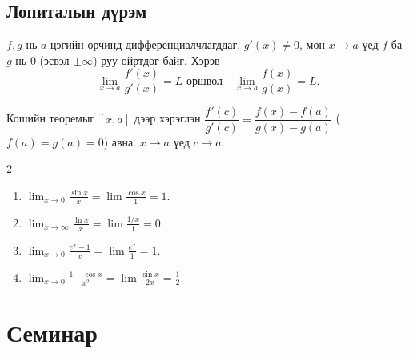 \subsection{Лопиталын дүрэм}

\begin{theorem}[Лопитал]
$f,g$ нь $a$ цэгийн орчинд дифференциалчлагддаг, $g'(x)\ne0$, мөн $x\to a$ үед $f$ ба $g$ нь $0$ (эсвэл $\pm\infty$) руу ойртдог байг. Хэрэв
\[
\lim_{x\to a}\frac{f'(x)}{g'(x)}=L \text{ оршвол}\quad 
\lim_{x\to a}\frac{f(x)}{g(x)}=L.
\]
\end{theorem}

\begin{prof}
Кошийн теоремыг $[x,a]$ дээр хэрэглэн $\dfrac{f'(c)}{g'(c)}=\dfrac{f(x)-f(a)}{g(x)-g(a)}$ ($f(a)=g(a)=0$) авна. $x\to a$ үед $c\to a$.
\end{prof}
\begin{example}
\begin{multicols}{2}
\begin{enumerate}[itemsep=2pt]
\item $\displaystyle \lim_{x\to0}\frac{\sin x}{x}=\lim\frac{\cos x}{1}=1.$
\item $\displaystyle \lim_{x\to\infty}\frac{\ln x}{x}=\lim\frac{1/x}{1}=0.$
\item $\displaystyle \lim_{x\to0}\frac{e^x-1}{x}=\lim\frac{e^x}{1}=1.$
\item $\displaystyle \lim_{x\to0}\frac{1-\cos x}{x^2}=\lim\frac{\sin x}{2x}=\frac12.$
\end{enumerate}
\end{multicols}
    
\end{example}
\section*{Семинар}

